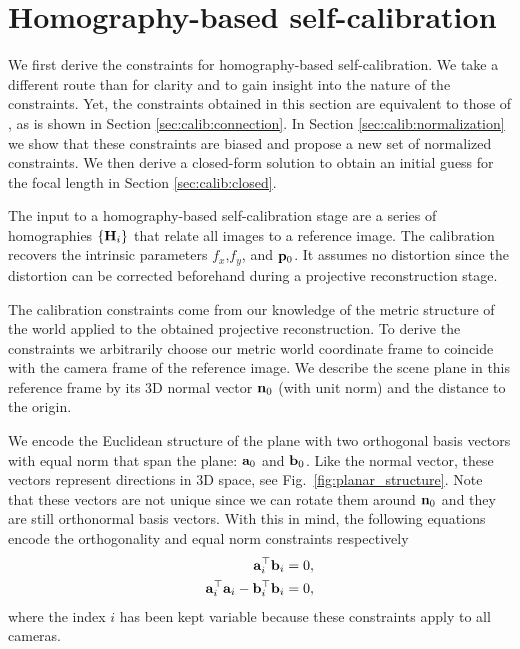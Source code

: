 \documentclass[10pt,twocolumn,letterpaper]{article}
\begin{document}
\section{Homography-based self-calibration}
\label{sec:calib}

We first derive the constraints for homography-based self-calibration. We take a different route than \cite{bocquillon2006} for clarity and to gain insight into the nature of the constraints. Yet, the constraints obtained in this section are equivalent to those of \cite{bocquillon2006}, as is shown in Section \ref{sec:calib:connection}. In Section \ref{sec:calib:normalization} we show that these constraints are biased and propose a new set of normalized constraints. We then derive a closed-form solution to obtain an initial guess for the focal length in Section \ref{sec:calib:closed}.

The input to a homography-based self-calibration stage are a series of homographies $\lbrace \mathbf{H}_i \rbrace$ that relate all images to a reference image. The calibration recovers the intrinsic parameters $f_x$,$f_y$, and $\mathbf{p}_0$. It assumes no distortion since the distortion can be corrected beforehand during a projective reconstruction stage.

The calibration constraints come from our knowledge of the metric structure of the world applied to the obtained projective reconstruction. To derive the constraints we arbitrarily choose our metric world coordinate frame to coincide with the camera frame of the reference image. We describe the scene plane in this reference frame by its 3D normal vector $\mathbf{n}_0$ (with unit norm) and the distance to the origin.

We encode the Euclidean structure of the plane with two orthogonal basis vectors with equal norm that span the plane: $\mathbf{a}_0$ and $\mathbf{b}_0$. Like the normal vector, these vectors represent directions in 3D space, see Fig.~\ref{fig:planar_structure}. Note that these vectors are not unique since we can rotate them around $\mathbf{n}_0$ and they are still orthonormal basis vectors. With this in mind, the following equations encode the orthogonality and equal norm constraints respectively
\begin{align}
\mathbf{a}_i^\top \mathbf{b}_i = 0, \label{eq:ortho_constraint} \\
\mathbf{a}_i^\top \mathbf{a}_i - \mathbf{b}_i^\top \mathbf{b}_i = 0, \label{eq:norm_constraint}
\end{align}
where the index $i$ has been kept variable because these constraints apply to all cameras.
\end{document}
